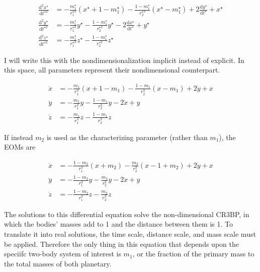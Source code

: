 \documentclass{article}
\newcommand{\dd}[2]{\frac{\mathrm{d}#1}{\mathrm{d}#2}}
\begin{document}
\[\begin{aligned}
    \dd{^2x^\star}{t^{\star2}}&=-\frac{m_1^\star}{r_1^{\star3}}(x^\star+1-m_1^\star)-\frac{1-m_1^\star}{r_2^{\star3}}(x^\star-m_1^\star)+2\dd{y^\star}{t^\star}+x^\star\\
    \dd{^2y^\star}{t^{\star2}}&=-\frac{m_1^\star}{r_1^{\star3}}y^\star-\frac{1-m_1^\star}{r_2^{\star3}}y^\star-2\dd{x^\star}{t^\star}+y^\star\\
    \dd{^2z^\star}{t^{\star2}}&=-\frac{m_1^\star}{r_1^{\star3}}z^\star-\frac{1-m_1^\star}{r_2^{\star3}}z^\star
\end{aligned}\]

I will write this with the nondimensionalization implicit instead of explicit. In this space, all parameters represent their nondimensional counterpart.

\[\boxed{\begin{aligned}
    \ddot{x}&=-\frac{m_1}{r_1^3}(x+1-m_1)-\frac{1-m_1}{r_2^3}(x-m_1)+2\dot{y}+x\\
    \ddot{y}&=-\frac{m_1}{r_1^3}y-\frac{1-m_1}{r_2^3}y-2\dot{x}+y\\
    \ddot{z}&=-\frac{m_1}{r_1^3}z-\frac{1-m_1}{r_2^3}z
\end{aligned}}\]

If instead $m_2$ is used as the characterizing parameter (rather than $m_1$), the EOMs are

\[\boxed{\begin{aligned}
    \ddot{x}&=-\frac{1-m_2}{r_1^3}(x+m_2)-\frac{m_2}{r_2^3}(x-1+m_2)+2\dot{y}+x\\
    \ddot{y}&=-\frac{1-m_2}{r_1^3}y-\frac{m_2}{r_2^3}y-2\dot{x}+y\\
    \ddot{z}&=-\frac{1-m_2}{r_1^3}z-\frac{m_2}{r_2^3}z
\end{aligned}}\]

The solutions to this differential equation solve the non-dimensional CR3BP, in which the bodies' masses add to 1 and the distance between them is 1. To translate it into real solutions, the time scale, distance scale, and mass scale must be applied. Therefore the only thing in this equation that depends upon the speciifc two-body system of interest is $m_1$, or the fraction of the primary mass to the total masses of both planetary.


\end{document}
